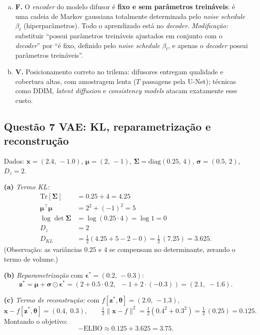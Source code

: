 \documentclass[11pt,a4paper]{article}
\newcommand{\thetav}{\boldsymbol{\theta}}
\begin{document}
\begin{enumerate}[a)]
    \item \textbf{F.} O \textit{encoder} do modelo difusor é \textbf{fixo e sem parâmetros treináveis}: é uma cadeia de Markov gaussiana totalmente determinada pelo \textit{noise schedule} $\beta_t$ (hiperparâmetros). Todo o aprendizado está no \textit{decoder}. \textit{Modificação:} substituir ``possui parâmetros treináveis ajustados em conjunto com o \textit{decoder}'' por ``é fixo, definido pelo \textit{noise schedule} $\beta_t$, e apenas o \textit{decoder} possui parâmetros treináveis''.

    \item \textbf{V.} Posicionamento correto no trilema: difusores entregam qualidade e cobertura altas, com amostragem lenta ($T$ passagens pela U-Net); técnicas como DDIM, \textit{latent diffusion} e \textit{consistency models} atacam exatamente esse custo.
\end{enumerate}

\subsection*{Questão 7 \textemdash{} VAE: KL, reparametrização e reconstrução}

Dados: $\mathbf{x} = (2.4,\, -1.0)$, $\boldsymbol{\mu} = (2,\, -1)$, $\boldsymbol{\Sigma} = \mathrm{diag}(0.25,\, 4)$, $\boldsymbol{\sigma} = (0.5,\, 2)$, $D_z = 2$.

\textbf{(a)} \textit{Termo KL:}
\begin{align*}
    \mathrm{Tr}[\boldsymbol{\Sigma}] &= 0.25 + 4 = 4.25 \\
    \boldsymbol{\mu}^{\top}\boldsymbol{\mu} &= 2^{2} + (-1)^{2} = 5 \\
    \log\det\boldsymbol{\Sigma} &= \log(0.25 \cdot 4) = \log 1 = 0 \\
    D_z &= 2 \\
    D_{KL} &= \tfrac{1}{2}\left(4.25 + 5 - 2 - 0\right) = \tfrac{1}{2}\,(7.25) = 3.625.
\end{align*}
(Observação: as variâncias $0.25$ e $4$ se compensam no determinante, zerando o termo de volume.)

\textbf{(b)} \textit{Reparametrização} com $\boldsymbol{\epsilon}^{*} = (0.2,\, -0.3)$:
\[
    \mathbf{z}^{*} = \boldsymbol{\mu} + \boldsymbol{\sigma} \odot \boldsymbol{\epsilon}^{*}
    = \left(2 + 0.5 \cdot 0.2,\;\; -1 + 2 \cdot (-0.3)\right)
    = (2.1,\; -1.6).
\]

\textbf{(c)} \textit{Termo de reconstrução:} com $f[\mathbf{z}^{*},\thetav] = (2.0,\, -1.3)$,
\[
    \mathbf{x} - f[\mathbf{z}^{*},\thetav] = (0.4,\; 0.3), \qquad
    \tfrac{1}{2}\lVert \mathbf{x} - f \rVert^{2} = \tfrac{1}{2}\left(0.4^{2} + 0.3^{2}\right) = \tfrac{1}{2}\,(0.25) = 0.125.
\]
Montando o objetivo:
\[
    -\mathrm{ELBO} \approx 0.125 + 3.625 = 3.75.
\]
\end{document}
